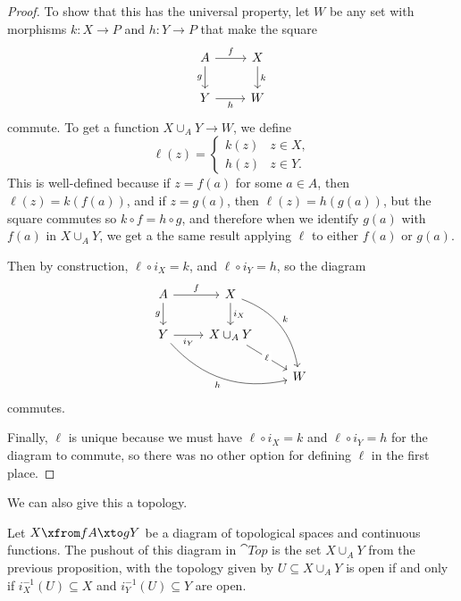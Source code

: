 \documentclass[noname]{notes}
\begin{document}
\begin{proof}
	To show that this has the universal property, let $W$ be any set with morphisms $k \colon X \to P$ and $h \colon Y \to P$ that make the square 
	\[
		\begin{tikzcd}
			A \ar[r, "f"] \ar[d, "g"'] & X \ar[d, "k"] \\
			Y \ar[r, "h"'] & W
		\end{tikzcd}	
	\]
	commute. To get a function $X \cup_A Y \to W$, we define 
	\[
		\ell(z) = 
		\begin{cases}
			k(z) & z \in X, \\
			h(z) & z \in Y. 
		\end{cases}
	\]
	This is well-defined because if $z = f(a)$ for some $a \in A$, then $\ell(z) = k(f(a))$, and if $z = g(a)$, then $\ell(z) = h(g(a))$, but the square commutes so $k \circ f = h \circ g$, and therefore when we identify $g(a)$ with $f(a)$ in $X \cup_A Y$, we get a the same result applying $\ell$ to either $f(a)$ or $g(a)$. 
	
	Then by construction, $\ell \circ i_X = k$, and $\ell \circ i_Y = h$, so the diagram 
	\[
		\begin{tikzcd}
			A \ar[r, "f"] \ar[d, "g"'] & X \ar[d, "i_X"] \ar[ddr, "k", bend left=30]\\
			Y \ar[r, "i_Y"']\ar[drr, "h"', bend right=30] & X \cup_A Y \ar[dr, "\ell" description] \\
			& & W
		\end{tikzcd}	
	\]
	commutes. 
	
	Finally, $\ell$ is unique because we must have $\ell \circ i_X = k$ and $\ell \circ i_Y = h$ for the diagram to commute, so there was no other option for defining $\ell$ in the first place. 
\end{proof}

We can also give this a topology. 

\begin{proposition}
	Let $X \xfrom f A \xto g Y$ be a diagram of topological spaces and continuous functions. The pushout of this diagram in $\cat{Top}$ is the set $X \cup_A Y$ from the previous proposition, with the topology given by $U \subseteq X \cup_A Y$ is open if and only if $i_X^{-1}(U) \subseteq X$ and $i_Y^{-1}(U) \subseteq Y$ are open. 
\end{proposition}
\end{document}
